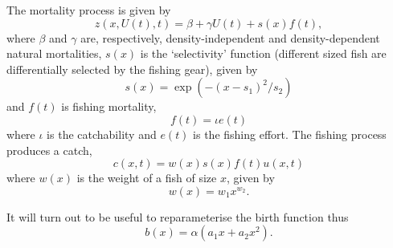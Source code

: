 \documentclass{article}
\begin{document}
The mortality process is given by 
\begin{equation}
  z(x,U(t),t) = \beta + \gamma U(t) + s(x)f(t)\label{seq:2a},
\end{equation}
where $\beta$ and $\gamma$ are, respectively, density-independent and density-dependent natural mortalities, $s(x)$ is the `selectivity' function (different sized fish are differentially selected by the fishing gear), given by
\begin{equation}
  s(x) = \exp(-(x-s_1)^2 / s_2)
\end{equation}
and $f(t)$ is fishing mortality, 
\begin{equation}
  f(t) = \iota e(t)  
\end{equation}
where $\iota$ is the catchability and $e(t)$ is the fishing effort.  The fishing process produces a catch,
\begin{equation}
  c(x,t) = w(x)s(x)f(t)u(x,t)
\end{equation}
where $w(x)$ is the weight of a fish of size $x$, given by
\begin{equation}
  w(x)=w_1 x^{w_2}.
\end{equation}

It will turn out to be useful to reparameterise the birth function thus
\begin{equation}
  b(x) = \alpha(a_1 x+a_2 x^2).
\end{equation}
\end{document}
